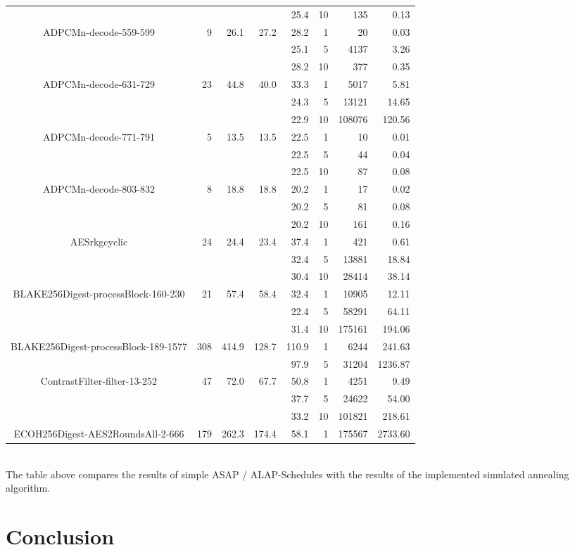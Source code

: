 \documentclass[colorback,accentcolor=tud1c,11pt]{tudreport}
\begin{document}
\begin{tabular}{ c | r | r | r | r | r | r | r }
    &  &  &  & 25.4 & 10 & 135 & 0.13 \\
   \multirow{3}{*}{ADPCMn-decode-559-599} & \multirow{3}{*}{9} & \multirow{3}{*}{26.1} & \multirow{3}{*}{27.2} & 28.2 & 1 & 20 & 0.03 \\
    &  &  &  & 25.1 & 5 & 4137 & 3.26 \\
   &  &  &  & 28.2 & 10 & 377 & 0.35 \\
   \multirow{3}{*}{ADPCMn-decode-631-729} & \multirow{3}{*}{23} & \multirow{3}{*}{44.8} & \multirow{3}{*}{40.0} & 33.3 & 1 & 5017 & 5.81 \\
    &  &  &  & 24.3 & 5 & 13121 & 14.65 \\
    &  &  &  & 22.9 & 10 & 108076 & 120.56 \\
   \multirow{3}{*}{ADPCMn-decode-771-791} & \multirow{3}{*}{5} & \multirow{3}{*}{13.5} & \multirow{3}{*}{13.5} & 22.5 & 1 & 10 & 0.01 \\
    &  &  &  & 22.5 & 5 & 44 & 0.04 \\
    &  &  &  & 22.5 & 10 & 87 & 0.08 \\
   \multirow{3}{*}{ADPCMn-decode-803-832} & \multirow{3}{*}{8} & \multirow{3}{*}{18.8} & \multirow{3}{*}{18.8} & 20.2 & 1 & 17 & 0.02 \\
    &  &  &  & 20.2 & 5 & 81 & 0.08 \\
    &  &  &  & 20.2 & 10 & 161 & 0.16 \\
   \multirow{3}{*}{AESrkgcyclic} & \multirow{3}{*}{24} & \multirow{3}{*}{24.4} & \multirow{3}{*}{23.4} & 37.4 & 1 & 421 & 0.61 \\
    &  &  &  & 32.4 & 5 & 13881 & 18.84 \\
    &  &  &  & 30.4 & 10 & 28414 & 38.14 \\
   \multirow{3}{*}{BLAKE256Digest-processBlock-160-230} & \multirow{3}{*}{21} & \multirow{3}{*}{57.4} & \multirow{3}{*}{58.4} & 32.4 & 1 & 10905 & 12.11 \\
    &  &  &  & 22.4 & 5 & 58291 & 64.11 \\
    &  &  &  & 31.4 & 10 & 175161 & 194.06 \\
   \multirow{2}{*}{BLAKE256Digest-processBlock-189-1577} & \multirow{2}{*}{308} & \multirow{2}{*}{414.9} & \multirow{2}{*}{128.7} & 110.9 & 1 & 6244 & 241.63 \\
    &  &  &  & 97.9 & 5 & 31204 & 1236.87 \\
   \multirow{3}{*}{ContrastFilter-filter-13-252} & \multirow{3}{*}{47} & \multirow{3}{*}{72.0} & \multirow{3}{*}{67.7} & 50.8 & 1 & 4251 & 9.49 \\
   &  &  &  & 37.7 & 5 & 24622 & 54.00 \\
    &  &  &  & 33.2 & 10 & 101821 & 218.61 \\
   \multirow{1}{*}{ECOH256Digest-AES2RoundsAll-2-666} & \multirow{1}{*}{179} & \multirow{1}{*}{262.3} & \multirow{1}{*}{174.4} & 58.1 & 1 & 175567 & 2733.60 \\
  \end{tabular}\\
  The table above compares the results of simple ASAP / ALAP-Schedules with the results of the implemented simulated annealing algorithm.
 


 
 \chapter{Conclusion}
 

%  
%  
\end{document}
